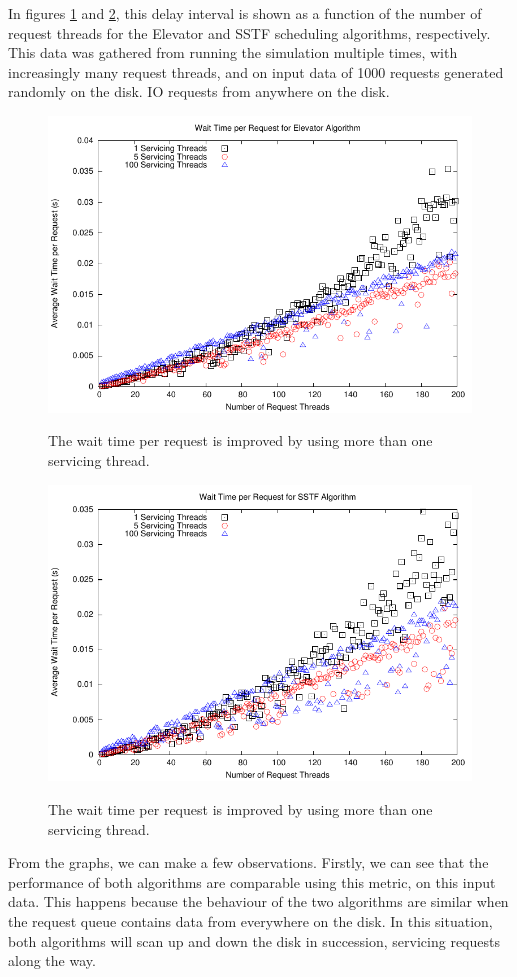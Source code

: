 \documentclass{report}
\begin{document}
In figures
\ref{fig:waittimeElevator} and \ref{fig:waittimeSSTF}, this delay interval is shown as a 
function of the number of request threads for the Elevator and SSTF scheduling algorithms,
respectively.
This data was gathered from running the simulation multiple times, with increasingly many
request threads, and on input data of 1000 requests generated randomly on the disk.
IO requests from anywhere on the disk. 

\begin{figure}[htb!]
    \centering
    \includegraphics[scale=1]{waittimeElevator.pdf}
    \label{fig:waittimeElevator}
    \caption{The wait time per request is improved by using more than one servicing thread.}
\end{figure}

\begin{figure}[htb!]
    \centering
    \includegraphics[scale=1]{waittimeSSTF.pdf}
    \label{fig:waittimeSSTF}
    \caption{The wait time per request is improved by using more than one servicing thread.}
\end{figure}
From the graphs, we can make a few observations. Firstly, we can see that the performance
of both algorithms are comparable using this metric, on this input data. This happens because
the behaviour of the two algorithms are similar when the request queue
contains data from everywhere on the disk. In this situation, both algorithms will scan up
and down the disk in succession, servicing requests along the way. 
\end{document}
